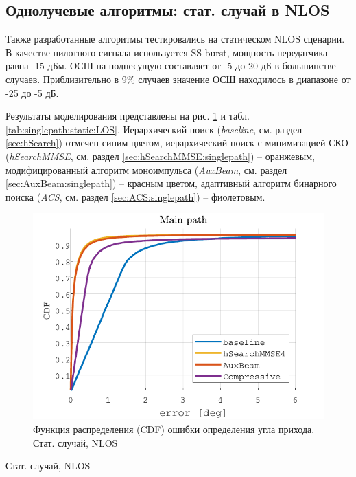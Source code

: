 \subsection{Однолучевые алгоритмы: стат. случай в NLOS}
\label{sec:singlepath:static:NLOS}

Также разработанные алгоритмы тестировались на статическом NLOS сценарии.
В качестве пилотного сигнала используется SS-burst, мощность передатчика равна -15 дБм.
ОСШ на поднесущую составляет от -5 до 20 дБ в большинстве случаев.
Приблизительно в 9\% случаев значение ОСШ находилось в диапазоне от -25 до -5 дБ.

Результаты моделирования представлены на рис. \ref{fig:singlepath:static:NLOS} и
табл. \ref{tab:singlepath:static:LOS}.  Иерархический поиск (\textit{baseline},
см. раздел \ref{sec:hSearch}) отмечен синим цветом, иерархический поиск с
минимизацией СКО (\textit{hSearchMMSE}, см. раздел
\ref{sec:hSearchMMSE:singlepath}) -- оранжевым, модифицированный алгоритм
моноимпульса (\textit{AuxBeam}, см. раздел \ref{sec:AuxBeam:singlepath}) --
красным цветом, адаптивный алгоритм бинарного поиска (\textit{ACS}, см. раздел
\ref{sec:ACS:singlepath}) -- фиолетовым.




\begin{figure}[ht]
  \centering
  \includegraphics{results/rus/singlepath-static-NLOS-1}
  \caption{Функция распределения (CDF) ошибки определения угла прихода. Стат. случай, NLOS}
  \label{fig:singlepath:static:NLOS}
\end{figure}
\begin{table}[h!]
  \begin{center}
    \caption{Стат. случай, NLOS}
    \small
    \label{tab:singlepath:static:NLOS}
  \end{center}
\end{table}

